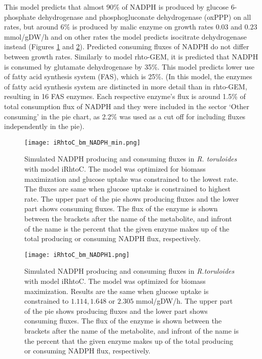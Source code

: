 This model predicts that almost $90\%$ of NADPH is produced by glucose 6-phosphate dehydrogenase and
phosphogluconate dehydrogenase (oxPPP) on all rates, but around $6\%$ is produced by malic enzyme on growth rates $0.03$ and $0.23$ \unit{mmol/gDW/h} and on other 
rates the model predicts isocitrate dehydrogenase instead (Figures \ref{fig:iRhtoC_bm_NADPH0} and \ref{fig:iRhtoC_bm_NADPH1}). 
Predicted consuming fluxes of NADPH do not differ between growth rates.
Similarly to model rhto-GEM, it is predicted that NADPH is consumed by glutamate dehydrogenase by 35\%. This model predicts lower use of fatty acid synthesis system (FAS), which is 25\%. (In this model, the enzymes of fatty acid synthesis system are distincted in more detail than in rhto-GEM, resulting in 16 FAS enzymes. Each respective enzyme's flux is around 1.5\% of total consumption flux of NADPH and they were included in the sector `Other consuming' in the pie chart, as 2.2\% was used as a cut off for including fluxes independently in the pie). 
\begin{figure}[H]
    \centering
    \texttt{[image: iRhtoC\_bm\_NADPH\_min.png]}
    \caption{Simulated NADPH producing and consuming fluxes in \textit{R. toruloides} with model iRhtoC. The model was optimized for biomass maximization and glucose 
    uptake was constrained to the lowest rate. The fluxes are same when glucose uptake is constrained to highest rate. The upper part of the pie shows producing fluxes and the lower part shows consuming fluxes. The flux of the enzyme is shown between the brackets after the name of the metabolite, and infront of the name is the percent
    that the given enzyme makes up of the total producing or consuming NADPH flux, respectively.}
    \label{fig:iRhtoC_bm_NADPH0}
\end{figure}
\begin{figure}[H]
    \centering
    \texttt{[image: iRhtoC\_bm\_NADPH1.png]}
    \caption{Simulated NADPH producing and consuming fluxes in \textit{R.toruloides} with model iRhtoC. The model was optimized for biomass maximization. Results are the same when glucose uptake is constrained to $1.114, 1.648$ or $2.305$ \unit{mmol/gDW/h}. The upper part of the pie shows producing fluxes and the lower part shows consuming fluxes. The flux of the enzyme is shown between the brackets after the name of the metabolite, and infront of the name is the percent that the given enzyme makes up of the total producing or consuming NADPH flux, respectively.}
    \label{fig:iRhtoC_bm_NADPH1}
\end{figure}

